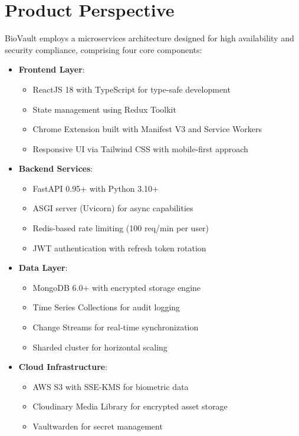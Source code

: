 \documentclass{scrreprt}
\begin{document}
\section{Product Perspective}
\label{sec:product-perspective}
BioVault employs a microservices architecture designed for high availability and security compliance, comprising four core components:

\begin{itemize}
    \item \textbf{Frontend Layer}:
    \begin{itemize}
        \item ReactJS 18 with TypeScript for type-safe development
        \item State management using Redux Toolkit
        \item Chrome Extension built with Manifest V3 and Service Workers
        \item Responsive UI via Tailwind CSS with mobile-first approach
    \end{itemize}
    
    \item \textbf{Backend Services}:
    \begin{itemize}
        \item FastAPI 0.95+ with Python 3.10+
        \item ASGI server (Uvicorn) for async capabilities
        \item Redis-based rate limiting (100 req/min per user)
        \item JWT authentication with refresh token rotation
    \end{itemize}
    
    \item \textbf{Data Layer}:
    \begin{itemize}
        \item MongoDB 6.0+ with encrypted storage engine
        \item Time Series Collections for audit logging
        \item Change Streams for real-time synchronization
        \item Sharded cluster for horizontal scaling
    \end{itemize}
    
    \item \textbf{Cloud Infrastructure}:
    \begin{itemize}
        \item AWS S3 with SSE-KMS for biometric data
        \item Cloudinary Media Library for encrypted asset storage
        \item Vaultwarden for secret management
    \end{itemize}
\end{itemize}
\end{document}
